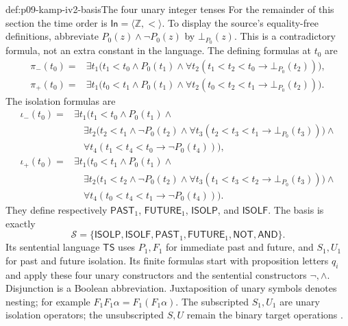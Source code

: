 \begin{hbdefinition}{def:p09-kamp-iv2-basis}{The four unary integer tenses}
For the remainder of this section the time order is
\(\mathsf{In}=\langle\mathbb Z,<\rangle\).
To display the source's equality-free definitions, abbreviate
\(P_0(z)\land\neg P_0(z)\) by \(\bot_{P_0}(z)\).
This is a contradictory formula, not an extra constant in the language.
The defining formulas at \(t_0\) are
\[
\begin{aligned}
 \pi_-(t_0)={}&\exists t_1\bigl(t_1<t_0\land P_0(t_1)\land
       \forall t_2(t_1<t_2<t_0\to\bot_{P_0}(t_2))\bigr),\\
 \pi_+(t_0)={}&\exists t_1\bigl(t_0<t_1\land P_0(t_1)\land
       \forall t_2(t_0<t_2<t_1\to\bot_{P_0}(t_2))\bigr).
\end{aligned}
\]
The isolation formulas are
\[
\begin{aligned}
 \iota_-(t_0)={}&\exists t_1\bigl(t_1<t_0\land P_0(t_1)\land\\
 &\quad\exists t_2\bigl(t_2<t_1\land\neg P_0(t_2)\land
       \forall t_3(t_2<t_3<t_1\to\bot_{P_0}(t_3))\bigr)\land\\
 &\quad\forall t_4(t_1<t_4<t_0\to\neg P_0(t_4))\bigr),\\
 \iota_+(t_0)={}&\exists t_1\bigl(t_0<t_1\land P_0(t_1)\land\\
 &\quad\exists t_2\bigl(t_1<t_2\land\neg P_0(t_2)\land
       \forall t_3(t_1<t_3<t_2\to\bot_{P_0}(t_3))\bigr)\land\\
 &\quad\forall t_4(t_0<t_4<t_1\to\neg P_0(t_4))\bigr).
\end{aligned}
\]
They define respectively \(\mathsf{PAST}_1\),
\(\mathsf{FUTURE}_1\), \(\mathsf{ISOLP}\), and
\(\mathsf{ISOLF}\). The basis is exactly
\[
 \mathcal S=\{\mathsf{ISOLP},\mathsf{ISOLF},
              \mathsf{PAST}_1,\mathsf{FUTURE}_1,
              \mathsf{NOT},\mathsf{AND}\}.
\]
Its sentential language \(\mathsf{TS}\) uses \(P_1,F_1\)
for immediate past and future, and \(S_1,U_1\) for past and
future isolation. Its finite formulas start with proposition letters
\(q_i\) and apply these four unary constructors and the
sentential constructors \(\neg,\land\).
Disjunction is a Boolean abbreviation. Juxtaposition of unary symbols
denotes nesting; for example \(F_1F_1\alpha=F_1(F_1\alpha)\).
The subscripted \(S_1,U_1\) are unary isolation operators;
the unsubscripted \(S,U\) remain the binary target operations
\cite[ch.~IV, def.~2 and thm.~2, p.~100]{Kamp1968}.
\end{hbdefinition}

